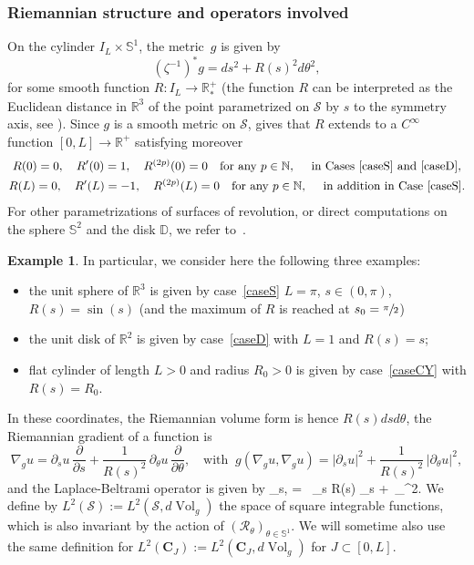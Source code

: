 \documentclass[JEP,XML,SOM,Unicode]{cedram}
\theoremstyle{definition}
\newtheorem{example}[lemma]{Example}
\newcommand{\calR}{\ensuremath{\mathcal R}}
\newcommand{\calS}{\ensuremath{\mathcal S}}
\newcommand{\mb}[1]{\ensuremath{\mathbb{#1}}}
\newcommand{\ID}{\ensuremath{\mathbb D}}
\newcommand{\N}{{\mb{N}}}
\newcommand{\R}{{\mb{R}}}
\newcommand{\bS}{\ensuremath{\mathbb S}}
\DeclareMathOperator{\Vol}{Vol}
\def\bal#1\nal{\begin{align*}#1\end{align*}}
\let\d\partial
\newcommand\CO[1]{\boldsymbol{C}_{\!#1}}
\begin{document}
\subsubsection*{Riemannian structure and operators involved}
On the cylinder $I_L\times \bS^1$, the metric~$g$ is given by
\begin{equation}
\label{e:metric-revol}
(\zeta^{-1})^*g = ds^2 + R(s)^2 d\theta^2,
\end{equation}
for some smooth function $R : I_L \to \R^+_*$ (the function $R$ can be interpreted as the Euclidean distance in $\R^3$ of the point parametrized on $\calS$ by $s$ to the symmetry axis, see \eg \cite[\S 3]{LL:18}). Since $g$ is a smooth metric on $\calS$, \cite[Prop.\,4.6]{Besse} gives that $R$ extends to a $C^\infty$ function $[0,L] \to \R^+$ satisfying moreover
\begin{gather}
\label{e:condR}
R(0) = 0, \quad R'(0) = 1, \quad R^{(2p)}(0) =0 \quad \text{for any } p \in \N, \quad \text{ in Cases~\ref{caseS} and~\ref{caseD}}, \\
R(L) = 0,\quad R'(L) = -1, \quad R^{(2p)}(L)=0 \quad \text{for any } p \in \N, \quad \text{ in addition in Case~\ref{caseS}}. \nonumber
\end{gather}
For other parametrizations of surfaces of revolution, or direct computations on the sphere $\bS^2$ and the disk $\ID$, we refer to~\cite[\S 3]{LL:18}.

\begin{example}
In particular, we consider here the following three examples:
\begin{itemize}
\item the unit sphere of $\R^3$ is given by case~\ref{caseS} $L=\pi$, $s\in (0,\pi)$, $R(s) = \sin(s)$ (and the maximum of $R$ is reached at $s_0= \sfrac{\pi}{2}$)
\item the unit disk of $\R^2$ is given by case~\ref{caseD} with $L=1$ and $R(s)=s$;
\item flat cylinder of length $L>0$ and radius $R_0>0$ is given by case~\ref{caseCY} with $R(s)= R_0$.
\end{itemize}
\end{example}
In these coordinates, the Riemannian volume form is hence $R(s) ds d\theta$, the Riemannian gradient of a function is
\begin{equation}
\label{e:reim-gradient}
\nabla_g u = \d_s u \,\frac{\d}{\d s} + \frac{1}{R(s)^2}\, \d_\theta u \,\frac{\d}{\d\theta}, \quad \text{with }\ g(\nabla_g u, \nabla_g u ) = |\d_s u|^2 + \frac{1}{R(s)^2}\, |\d_\theta u|^2,
\end{equation}
and the Laplace-Beltrami operator is given by
\bal
\Delta_{s,\theta} = \, \d_s R(s) \d_s +  \,\d_\theta^2.
\nal
We define by $L^2(\calS) := L^2(\calS, d\Vol_g)$ the space of square integrable functions, which is also invariant by the action of $(\calR_\theta)_{\theta \in \bS^1}$. We will sometime also use the same definition for $L^2(\CO{J}) := L^2(\CO{J}, d\Vol_g)$ for $J\subset [0,L]$.
\end{document}
